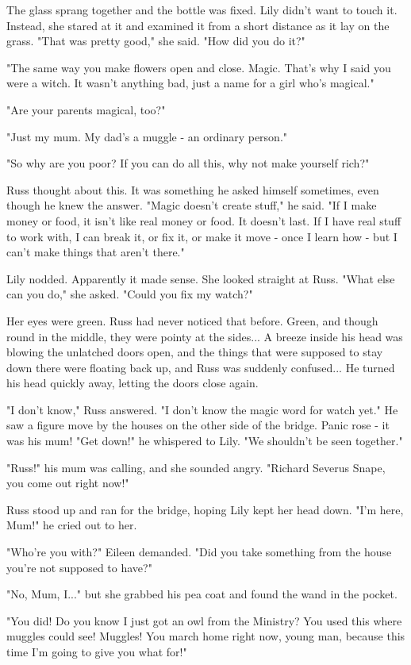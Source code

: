 \documentclass[a4paper,11pt]{article}
\begin{document}
The glass sprang together and the bottle was fixed. Lily didn't want to touch it. Instead, she stared at it and examined it from a short distance as it lay on the grass. "That was pretty good," she said. "How did you do it?"

"The same way you make flowers open and close. Magic. That's why I said you were a witch. It wasn't anything bad, just a name for a girl who's magical."

"Are your parents magical, too?"

"Just my mum. My dad's a muggle - an ordinary person."

"So why are you poor? If you can do all this, why not make yourself rich?"

Russ thought about this. It was something he asked himself sometimes, even though he knew the answer. "Magic doesn't create stuff," he said. "If I make money or food, it isn't like real money or food. It doesn't last. If I have real stuff to work with, I can break it, or fix it, or make it move - once I learn how - but I can't make things that aren't there."

Lily nodded. Apparently it made sense. She looked straight at Russ. "What else can you do," she asked. "Could you fix my watch?"

Her eyes were green. Russ had never noticed that before. Green, and though round in the middle, they were pointy at the sides... A breeze inside his head was blowing the unlatched doors open, and the things that were supposed to stay down there were floating back up, and Russ was suddenly confused... He turned his head quickly away, letting the doors close again.

"I don't know," Russ answered. "I don't know the magic word for watch yet." He saw a figure move by the houses on the other side of the bridge. Panic rose - it was his mum! "Get down!" he whispered to Lily. "We shouldn't be seen together."

"Russ!" his mum was calling, and she sounded angry. "Richard Severus Snape, you come out right now!"

Russ stood up and ran for the bridge, hoping Lily kept her head down. "I'm here, Mum!" he cried out to her.

"Who're you with?" Eileen demanded. "Did you take something from the house you're not supposed to have?"

"No, Mum, I..." but she grabbed his pea coat and found the wand in the pocket.

"You did! Do you know I just got an owl from the Ministry? You used this where muggles could see! Muggles! You march home right now, young man, because this time I'm going to give you what for!"
\end{document}

